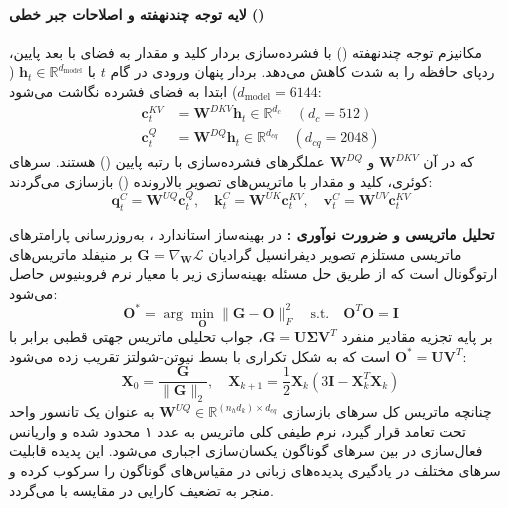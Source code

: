 \paragraph*{لایه توجه چندنهفته و اصلاحات جبر خطی ()}
مکانیزم توجه چندنهفته () \cite{liu2024deepseekv2} با فشرده‌سازی بردار کلید و مقدار به فضای با بعد پایین، ردپای حافظه  را به شدت کاهش می‌دهد. بردار پنهان ورودی در گام $t$ با $\mathbf{h}_t \in \mathbb{R}^{d_{\text{model}}}$ ($d_{\text{model}}=6144$) ابتدا به فضای فشرده نگاشت می‌شود:
\begin{align}
    \mathbf{c}_t^{KV} &= \mathbf{W}^{DKV} \mathbf{h}_t \in \mathbb{R}^{d_c} \quad (d_c = 512) \\
    \mathbf{c}_t^Q &= \mathbf{W}^{DQ} \mathbf{h}_t \in \mathbb{R}^{d_{cq}} \quad (d_{cq} = 2048)
\end{align}
که در آن $\mathbf{W}^{DKV}$ و $\mathbf{W}^{DQ}$ عملگرهای فشرده‌سازی با رتبه پایین () هستند. سرهای کوئری، کلید و مقدار با ماتریس‌های تصویر بالارونده () بازسازی می‌گردند:
\begin{equation}
    \mathbf{q}_t^C = \mathbf{W}^{UQ} \mathbf{c}_t^Q, \quad \mathbf{k}_t^C = \mathbf{W}^{UK} \mathbf{c}_t^{KV}, \quad \mathbf{v}_t^C = \mathbf{W}^{UV} \mathbf{c}_t^{KV}
\end{equation}

\textbf{تحلیل ماتریسی و ضرورت نوآوری :}
در بهینه‌ساز استاندارد  \cite{jordan2024muon}، به‌روزرسانی پارامترهای ماتریسی مستلزم تصویر دیفرانسیل گرادیان $\mathbf{G} = \nabla_{\mathbf{W}} \mathcal{L}$ بر منیفلد ماتریس‌های ارتوگونال است که از طریق حل مسئله بهینه‌سازی زیر با معیار نرم فروبنیوس حاصل می‌شود:
\begin{equation}
    \mathbf{O}^* = \arg\min_{\mathbf{O}} \|\mathbf{G} - \mathbf{O}\|_F^2 \quad \text{s.t.} \quad \mathbf{O}^T \mathbf{O} = \mathbf{I}
\end{equation}
بر پایه تجزیه مقادیر منفرد $\mathbf{G} = \mathbf{U} \mathbf{\Sigma} \mathbf{V}^T$، جواب تحلیلی ماتریس جهتی قطبی برابر با $\mathbf{O}^* = \mathbf{U} \mathbf{V}^T$ است که به شکل تکراری با بسط نیوتن-شولتز تقریب زده می‌شود:
\begin{equation}
    \mathbf{X}_0 = \frac{\mathbf{G}}{\|\mathbf{G}\|_2}, \quad \mathbf{X}_{k+1} = \frac{1}{2} \mathbf{X}_k \left(3\mathbf{I} - \mathbf{X}_k^T \mathbf{X}_k\right)
\end{equation}
چنانچه ماتریس کل سرهای بازسازی $\mathbf{W}^{UQ} \in \mathbb{R}^{(n_h d_k) \times d_{cq}}$ به عنوان یک تانسور واحد تحت تعامد قرار گیرد، نرم طیفی کلی ماتریس به عدد ۱ محدود شده و واریانس فعال‌سازی در بین سرهای گوناگون یکسان‌سازی اجباری می‌شود. این پدیده قابلیت سرهای مختلف در یادگیری پدیده‌های زبانی در مقیاس‌های گوناگون را سرکوب کرده و منجر به تضعیف کارایی در مقایسه با  می‌گردد.

